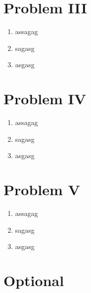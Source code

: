 \documentclass[letterpaper,11pt,twoside]{article}
\begin{document}
\section*{Problem III}
\begin{enumerate}[itemsep=0pt,topsep=0pt,label=\alph*.]
  \item assagag
  \item sagasg
  \item asgasg
\end{enumerate}
\section*{Problem IV}
\begin{enumerate}[itemsep=0pt,topsep=0pt,label=\alph*.]
  \item assagag
  \item sagasg
  \item asgasg
\end{enumerate}
\section*{Problem V}
\begin{enumerate}[itemsep=0pt,topsep=0pt,label=\alph*.]
  \item assagag
  \item sagasg
  \item asgasg
\end{enumerate}



\section*{Optional}
\end{document}
